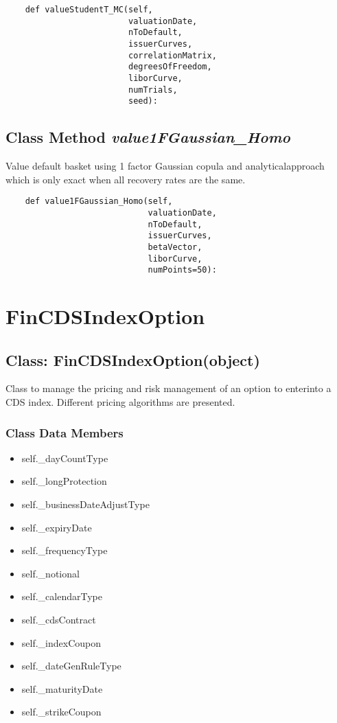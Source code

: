 \documentclass[twoside,11pt]{book}
\begin{document}
\begin{lstlisting}
    def valueStudentT_MC(self,
                         valuationDate,
                         nToDefault,
                         issuerCurves,
                         correlationMatrix,
                         degreesOfFreedom,
                         liborCurve,
                         numTrials,
                         seed):
\end{lstlisting}

\subsection{Class Method {\it value1FGaussian\_Homo}}
Value default basket using 1 factor Gaussian copula and analyticalapproach which is only exact when all recovery rates are the same. 

\begin{lstlisting}
    def value1FGaussian_Homo(self,
                             valuationDate,
                             nToDefault,
                             issuerCurves,
                             betaVector,
                             liborCurve,
                             numPoints=50):
\end{lstlisting}

\newpage
\section{FinCDSIndexOption}

\subsection{Class: FinCDSIndexOption(object)}
Class to manage the pricing and risk management of an option to enterinto a CDS index. Different pricing algorithms are presented. 

\subsubsection{Class Data Members}
\begin{itemize}
\item{self.\_dayCountType}
\item{self.\_longProtection}
\item{self.\_businessDateAdjustType}
\item{self.\_expiryDate}
\item{self.\_frequencyType}
\item{self.\_notional}
\item{self.\_calendarType}
\item{self.\_cdsContract}
\item{self.\_indexCoupon}
\item{self.\_dateGenRuleType}
\item{self.\_maturityDate}
\item{self.\_strikeCoupon}
\end{itemize}
\end{document}
